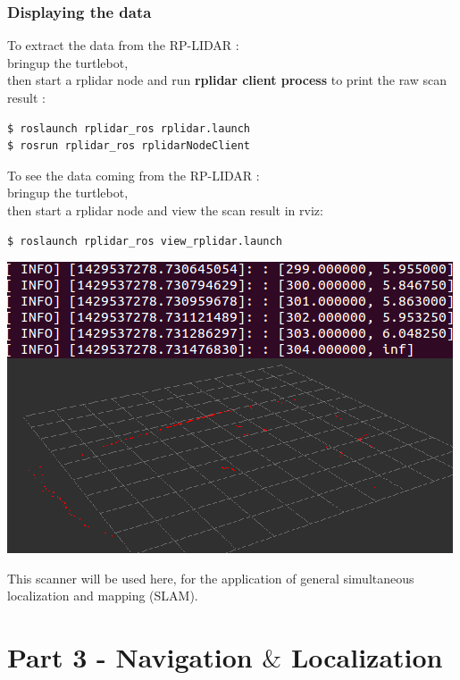 \documentclass[10pt,a4paper]{article}
\begin{document}
\subsubsection{Displaying the data}
To extract the data from the RP-LIDAR :\\
bringup the turtlebot, \\
then start a rplidar node and run \textbf{rplidar client process} to print the raw scan result :
\begin{lstlisting}[frame=single] 
$ roslaunch rplidar_ros rplidar.launch
$ rosrun rplidar_ros rplidarNodeClient
\end{lstlisting}

\begin{center}
\end{center}

To see the data coming from the RP-LIDAR :\\
bringup the turtlebot, \\
then start a rplidar node and view the scan result in rviz:
\begin{lstlisting}[frame=single] 
$ roslaunch rplidar_ros view_rplidar.launch
\end{lstlisting}

\begin{center}
\includegraphics[width=\textwidth]{images/infos+view.png}\\
\end{center}

This scanner will be used here, for the application of general simultaneous localization and mapping (SLAM).

\section{Part 3 - Navigation $\&$ Localization}
\end{document}
